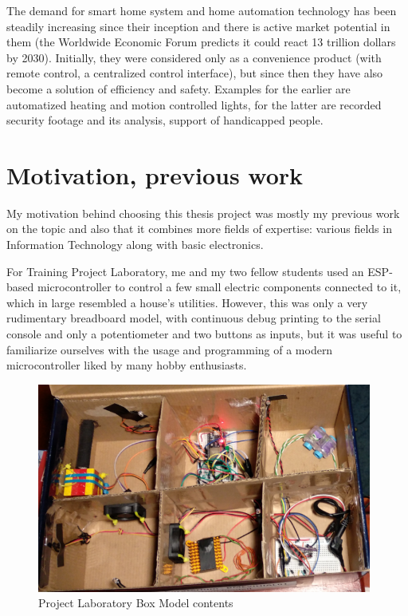 The demand for smart home system and home automation technology has been steadily increasing since their inception and there is active market potential in them (the Worldwide Economic Forum predicts it could react 13 trillion dollars by 2030). Initially, they were considered only as a convenience product (with remote control, a centralized control interface), but since then they have also become a solution of efficiency and safety. Examples for the earlier are automatized heating and motion controlled lights, for the latter are recorded security footage and its analysis, support of handicapped people. \cite{ChakSHS}

\section{Motivation, previous work}

My motivation behind choosing this thesis project was mostly my previous work on the topic and also that it combines more fields of expertise: various fields in Information Technology along with basic electronics.

For Training Project Laboratory, me and my two fellow students used an ESP-based microcontroller to control a few small electric components connected to it, which in large resembled a house's utilities. However, this was only a very rudimentary breadboard model, with continuous debug printing to the serial console and only a potentiometer and two buttons as inputs, but it was useful to familiarize ourselves with the usage and programming of a modern microcontroller liked by many hobby enthusiasts.

\begin{figure}[!ht]
    \centering
    \includegraphics[width=110mm, keepaspectratio]{figures/proj_lab_box.png}
    \caption{Project Laboratory Box Model contents}
    \label{fig:ProjLabBox}
\end{figure}

